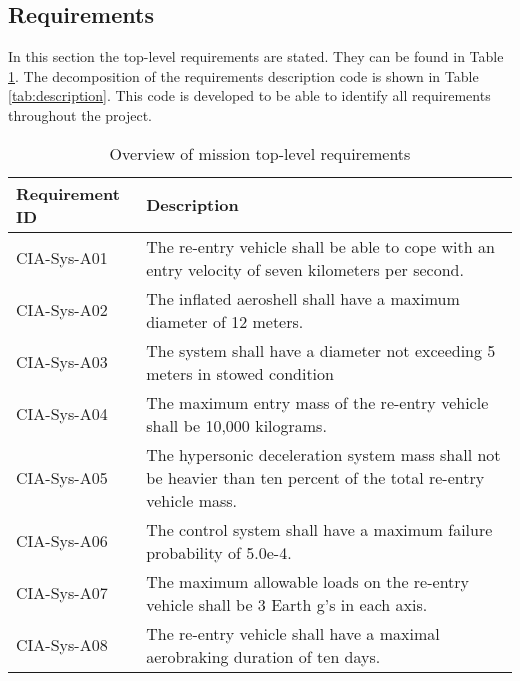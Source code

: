 \subsection{Requirements} \label{subsec:systemrequirements}
In this section the top-level requirements are stated. They can be found in Table \ref{tab:requirements}. The decomposition of the requirements description code is shown in Table \ref{tab:description}. This code is developed to be able to identify all requirements throughout the project.
\vspace{-4mm}
\begin{table}[H]
	\caption{Overview of mission top-level requirements}
	\begin{tabular}{|p{}|p{}|}
    \hline
    Requirement ID          & Description                                                                                                      \\ \hline \hline
    CIA-Sys-A01 & The re-entry vehicle shall be able to cope with an entry velocity of seven kilometers per second.                \\ \hline
    CIA-Sys-A02 & The inflated aeroshell shall have a maximum diameter of 12 meters.                                               \\ \hline
    CIA-Sys-A03 & The system shall have a diameter not exceeding 5 meters in stowed condition                                                          \\ \hline
    CIA-Sys-A04 & The maximum entry mass of the re-entry vehicle shall be 10,000 kilograms.                                         \\ \hline
    CIA-Sys-A05 & The hypersonic deceleration system mass shall not be heavier than ten percent of the total re-entry vehicle mass. \\ \hline
    CIA-Sys-A06 & The control system shall have a maximum failure probability of 5.0e-4.                                           \\ \hline
    CIA-Sys-A07 & The maximum allowable loads on the re-entry vehicle shall be 3 Earth g's in each axis.                            \\ \hline
    CIA-Sys-A08 & The re-entry vehicle shall have a maximal aerobraking duration of ten days.                                      \\ \hline
    \end{tabular}
    \label{tab:requirements}
\end{table}

